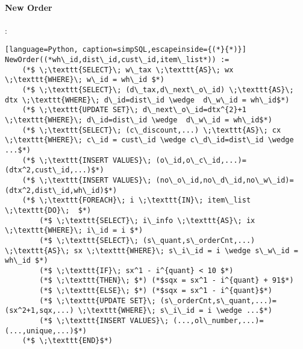 \paragraph{New Order}:
\lstset{style=simpSQLstyle}
\begin{lstlisting}[language=Python, caption=simpSQL,escapeinside={(*}{*)}]
NewOrder((*wh\_id,dist\_id,cust\_id,item\_list*)) :=
	(*$ \;\texttt{SELECT}\; w\_tax \;\texttt{AS}\; wx \;\texttt{WHERE}\; w\_id = wh\_id $*)
	(*$ \;\texttt{SELECT}\; (d\_tax,d\_next\_o\_id) \;\texttt{AS}\; dtx \;\texttt{WHERE}\; d\_id=dist\_id \wedge  d\_w\_id = wh\_id$*)
	(*$ \;\texttt{UPDATE SET}\; d\_next\_o\_id=dtx^{2}+1 \;\texttt{WHERE}\; d\_id=dist\_id \wedge  d\_w\_id = wh\_id$*)
	(*$ \;\texttt{SELECT}\; (c\_discount,...) \;\texttt{AS}\; cx \;\texttt{WHERE}\; c\_id = cust\_id \wedge c\_d\_id=dist\_id \wedge ...$*)
	(*$ \;\texttt{INSERT VALUES}\; (o\_id,o\_c\_id,...)=(dtx^2,cust\_id,...)$*)
	(*$ \;\texttt{INSERT VALUES}\; (no\_o\_id,no\_d\_id,no\_w\_id)=(dtx^2,dist\_id,wh\_id)$*)
	(*$ \;\texttt{FOREACH}\; i \;\texttt{IN}\; item\_list \;\texttt{DO}\;  $*)
		(*$ \;\texttt{SELECT}\; i\_info \;\texttt{AS}\; ix \;\texttt{WHERE}\; i\_id = i $*)
		(*$ \;\texttt{SELECT}\; (s\_quant,s\_orderCnt,...) \;\texttt{AS}\; sx \;\texttt{WHERE}\; s\_i\_id = i \wedge s\_w\_id = wh\_id $*)
		(*$ \;\texttt{IF}\; sx^1 - i^{quant} < 10 $*)
		(*$ \;\texttt{THEN}\; $*) (*$sqx = sx^1 - i^{quant} + 91$*)
		(*$ \;\texttt{ELSE}\; $*) (*$sqx = sx^1 - i^{quant}$*)
		(*$ \;\texttt{UPDATE SET}\; (s\_orderCnt,s\_quant,...)=(sx^2+1,sqx,...) \;\texttt{WHERE}\; s\_i\_id = i \wedge ...$*)
		(*$ \;\texttt{INSERT VALUES}\; (...,ol\_number,...)=(...,unique,...)$*)
	(*$ \;\texttt{END}$*)
	

	
\end{lstlisting}

